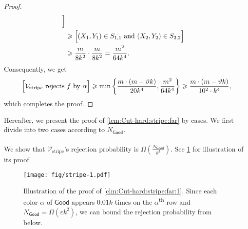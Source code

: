 \documentclass[11pt,fleqn]{article}
\renewcommand{\geq}{\geqslant}
\renewcommand{\epsilon}{\varepsilon}
\renewcommand{\theta}{\vartheta}
\newcommand{\nth}[1]{#1\textsuperscript{th}\xspace}
\newcommand{\V}{\calV}
\newcommand{\f}{f}
\newcommand{\Vstripe}{\V_\mathrm{stripe}}
\newcommand{\Good}{\mathsf{Good}}
\newcommand{\calV}{\mathcal{V}}
\let\Pr\relax\DeclareMathOperator*{\Pr}{\mathbb{P}}
\theoremstyle{definition}
\numberwithin{equation}{section}
\begin{document}
\begin{proof}
\begin{align}
\begin{aligned}
    \Bigr] \\
    & \geq \Pr\Bigl[ (X_1,Y_1) \in S_{1,1} \text{ and } (X_2,Y_2) \in S_{2,2} \Bigr] \\
    & \geq \frac{m}{8k^2} \cdot \frac{m}{8k^2} = \frac{m^2}{64k^4}.
\end{aligned}
\end{align}
Consequently, we get
\begin{align}
    \Pr\Bigl[ \Vstripe \text{ rejects } \f \text{ by } \alpha \Bigr]
    \geq \min\left\{ \frac{m \cdot (m-\theta k)}{20 k^4}, \frac{m^2}{64k^4} \right\}
    \geq \frac{m\cdot(m-\theta k)}{10^2 \cdot k^4},
\end{align}
which completes the proof.
\end{proof}


Hereafter, we present the proof of \cref{lem:Cut-hard:stripe:far} by cases.
We first divide into two cases according to $N_\Good$.


\paragraph{\fbox{(Case 1) $N_\Good \geq 0.01 \epsilon k^2$.}}
We show that $\Vstripe$'s rejection probability is $\Omega\left(\frac{N_\Good}{k^3}\right)$.
See \cref{fig:Cut-hard:stripe:far:1} for illustration of its proof.


\begin{figure}[t]
    \centering
    \texttt{[image: fig/stripe-1.pdf]}
    \caption{
        Illustration of the proof of \cref{clm:Cut-hard:stripe:far:1}.
        Since each color $\alpha$ of $\Good$ appears $0.01k$ times on the \nth{$\alpha$} row and
        $N_\Good = \Omega(\epsilon k^2)$,
        we can bound the rejection probability from below.
    }
    \label{fig:Cut-hard:stripe:far:1}
\end{figure}
\end{document}
